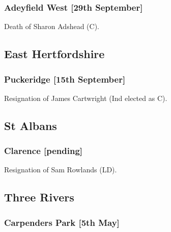 \documentclass[a4paper,openany]{book}
\begin{document}
\begin{resultsiii}
\subsubsection*{Adeyfield West \hspace*{\fill}\nolinebreak[1]%
\enspace\hspace*{\fill}
[29th September]}


Death of Sharon Adshead (C).

\subsection*{East Hertfordshire}

\subsubsection*{Puckeridge \hspace*{\fill}\nolinebreak[1]%
\enspace\hspace*{\fill}
[15th September]}


Resignation of James Cartwright (Ind elected as C).

\subsection*{St Albans}

\subsubsection*{Clarence \hspace*{\fill}\nolinebreak[1]%
\enspace\hspace*{\fill}
[pending]}


Resignation of Sam Rowlands (LD).

\subsection*{Three Rivers}

\subsubsection*{Carpenders Park \hspace*{\fill}\nolinebreak[1]%
\enspace\hspace*{\fill}
[5th May]}


\end{resultsiii}
\end{document}
